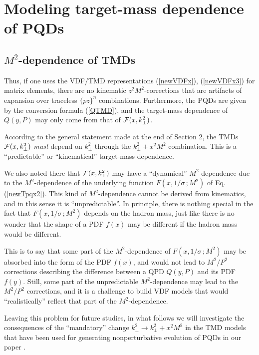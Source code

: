\documentclass[final,5p,times,twocolumn]{elsarticle}
\begin{document}
 
 
  \setcounter{equation}{0} 
\section{Modeling target-mass dependence of   PQDs} 

\subsection{$M^2$-dependence of TMDs}

Thus, if one uses the VDF/TMD representations (\ref{newVDFx}), (\ref{newVDFx3})
for matrix elements,
there   are no kinematic $z^2M^2$-corrections 
that are artifacts of expansion  over traceless $\{pz\}^n$ combinations. 
Furthermore, the PQDs are given by the conversion formula
(\ref{QTMD}), and the target-mass dependence 
of $Q(y, P)$  may only come from that of ${\cal  F} (x, k_\perp^2)$. 

According to  the general statement made at the end of Section 2,  the  TMDs 
${\cal  F} (x, k_\perp^2)$  {\it must }  depend on $k_\perp^2$
through the \mbox{$k_\perp^2 +x^2 M^2$}  combination.  
This is a ``predictable''  or ``kinematical'' target-mass dependence.

We also noted there  that ${\cal  F} (x, k_\perp^2)$ may  have 
a ``dynamical'' $M^2$-dependence due to the $M^2$-dependence 
of the underlying function $F  (x, 1/\sigma\, ; M^2)$ of 
 Eq. (\ref{newTpqx2}).   This kind of \mbox{$M^2$-dependence}  
 cannot be   derived from kinematics, and in this sense it is ``unpredictable''.
 In principle, there is nothing special in the fact that $F  (x, 1/\sigma\, ; M^2)$
 depends on the hadron  mass,  just like there is no wonder 
 that the shape of a PDF $f(x)$ may be different if the  hadron mass   would be  different.
 
 This is to say that some part of the $M^2$-dependence 
of   $F  (x, 1/\sigma\, ; M^2)$  may be absorbed into  the form of the PDF $f(x)$,
and   would not lead to $M^2/P^2$ corrections describing the difference 
between a QPD $Q (y,P)$ and its PDF $f(y)$. 
 Still, some part of the unpredictable $M^2$-dependence 
 may lead to the $M^2/P^2$ corrections, and it is a challenge 
 to build VDF models   that would  ``realistically'' reflect that part 
 of the $M^2$-dependence.
 
  Leaving this problem for future studies,
 in what follows we will investigate   the consequences 
 of the ``mandatory'' change  $k_\perp^2 \to k_\perp^2 + x^2 M^2$
 in the TMD models that have been used for generating nonperturbative 
 evolution of PQDs  in our paper \cite{Radyushkin:2016hsy}.  
 
\end{document}
